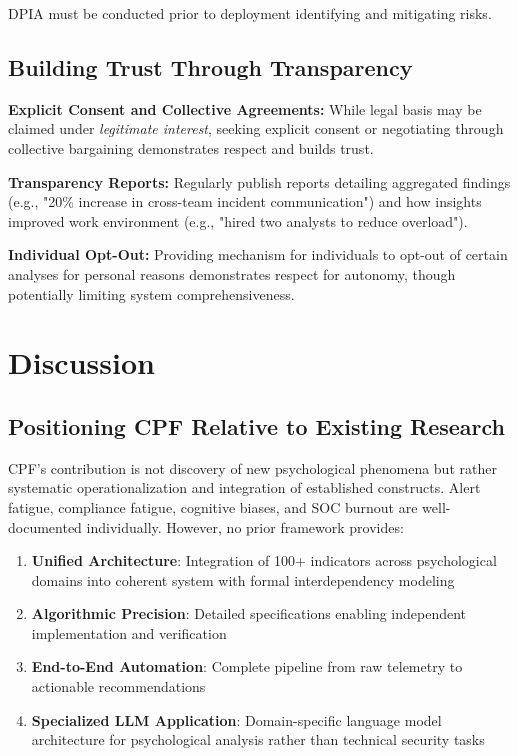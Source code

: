 \documentclass[11pt, a4paper]{article}
\begin{document}
DPIA must be conducted prior to deployment identifying and mitigating risks.

\subsection{Building Trust Through Transparency}

\textbf{Explicit Consent and Collective Agreements:} While legal basis may be claimed under \textit{legitimate interest}, seeking explicit consent or negotiating through collective bargaining demonstrates respect and builds trust.

\textbf{Transparency Reports:} Regularly publish reports detailing aggregated findings (e.g., "20\% increase in cross-team incident communication") and how insights improved work environment (e.g., "hired two analysts to reduce overload").

\textbf{Individual Opt-Out:} Providing mechanism for individuals to opt-out of certain analyses for personal reasons demonstrates respect for autonomy, though potentially limiting system comprehensiveness.

\section{Discussion}
\label{sec:discussion}

\subsection{Positioning CPF Relative to Existing Research}

CPF's contribution is not discovery of new psychological phenomena but rather systematic operationalization and integration of established constructs. Alert fatigue\cite{gupta2024alert,kearney2023combating}, compliance fatigue\cite{stanton2016security,beautement2008compliance}, cognitive biases\cite{tsohou2015analyzing,kahneman2011thinking}, and SOC burnout\cite{devo2022soc,tines2023burnout} are well-documented individually. However, no prior framework provides:

\begin{enumerate}
\item \textbf{Unified Architecture}: Integration of 100+ indicators across psychological domains into coherent system with formal interdependency modeling
\item \textbf{Algorithmic Precision}: Detailed specifications enabling independent implementation and verification
\item \textbf{End-to-End Automation}: Complete pipeline from raw telemetry to actionable recommendations
\item \textbf{Specialized LLM Application}: Domain-specific language model architecture for psychological analysis rather than technical security tasks
\end{enumerate}
\end{document}
